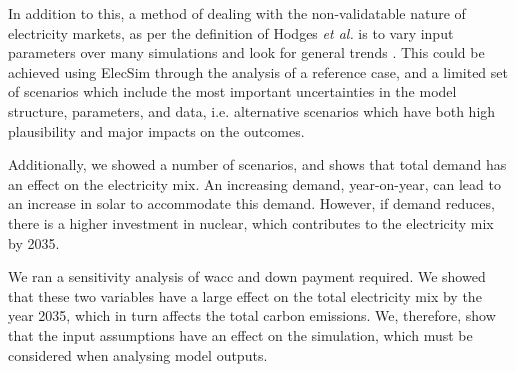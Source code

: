 In addition to this, a method of dealing with the non-validatable nature of electricity markets, as per the definition of Hodges \textit{et al.} is to vary input parameters over many simulations and look for general trends \cite{Hodges}. This could be achieved using ElecSim through the analysis of a reference case, and a limited set of scenarios which include the most important uncertainties in the model structure, parameters, and data, i.e. alternative scenarios which have both high plausibility and major impacts on the outcomes.

Additionally, we showed a number of scenarios, and shows that total demand has an effect on the electricity mix. An increasing demand, year-on-year, can lead to an increase in solar to accommodate this demand. However, if demand reduces, there is a higher investment in nuclear, which contributes to the electricity mix by 2035.

We ran a sensitivity analysis of \acrfull{wacc} and down payment required. We showed that these two variables have a large effect on the total electricity mix by the year 2035, which in turn affects the total carbon emissions. We, therefore, show that the input assumptions have an effect on the simulation, which must be considered when analysing model outputs.


















